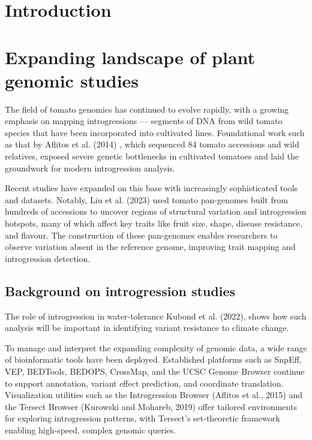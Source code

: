 \documentclass[unnumsec,webpdf,contemporary,large]{oup-authoring-template}%
\theoremstyle{thmstyleone}%
\theoremstyle{thmstyletwo}%
\theoremstyle{thmstylethree}%
\begin{document}

\maketitle
\section{Introduction}

\section{Expanding landscape of plant genomic studies}\label{sec2}

The field of tomato genomics has continued to evolve rapidly, with a growing emphasis on mapping introgressions — segments of DNA from wild tomato species that have been incorporated into cultivated lines. Foundational work such as that by Aflitos et al. (2014) , which sequenced 84 tomato accessions and wild relatives, exposed severe genetic bottlenecks in cultivated tomatoes and laid the groundwork for modern introgression analysis. 

Recent studies have expanded on this base with increasingly sophisticated tools and datasets. Notably, Liu et al. (2023) used tomato pan-genomes built from hundreds of accessions to uncover regions of structural variation and introgression hotspots, many of which affect key traits like fruit size, shape, disease resistance, and flavour. The construction of these pan-genomes enables researchers to observe variation absent in the reference genome, improving trait mapping and introgression detection. 

\subsection{Background on introgression studies}\label{subsec1}

The role of introgression in water-tolerance Kubond et al. (2022), shows how such analysis will be important in identifying variant resistance to climate change.  

To manage and interpret the expanding complexity of genomic data, a wide range of bioinformatic tools have been deployed. Established platforms such as SnpEff, VEP, BEDTools, BEDOPS, CrossMap, and the UCSC Genome Browser continue to support annotation, variant effect prediction, and coordinate translation. Visualization utilities such as the Introgression Browser (Aflitos et al., 2015) and the Tersect Browser (Kurowski and Mohareb, 2019) offer tailored environments for exploring introgression patterns, with Tersect’s set-theoretic framework enabling high-speed, complex genomic queries. 
\end{document}
